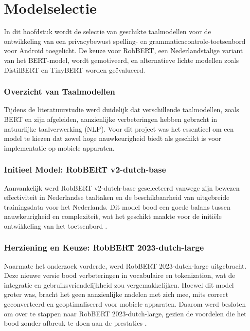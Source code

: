 \chapter{Modelselectie}
\label{ch:modelselectie}

In dit hoofdstuk wordt de selectie van geschikte taalmodellen voor de ontwikkeling van een privacybewust spelling- en grammaticacontrole-toetsenbord voor Android toegelicht. De keuze voor RobBERT, een Nederlandstalige variant van het BERT-model, wordt gemotiveerd, en alternatieve lichte modellen zoals DistilBERT en TinyBERT worden geëvalueerd.

\subsection{Overzicht van Taalmodellen}

Tijdens de literatuurstudie werd duidelijk dat verschillende taalmodellen, zoals BERT en zijn afgeleiden, aanzienlijke verbeteringen hebben gebracht in natuurlijke taalverwerking (NLP). Voor dit project was het essentieel om een model te kiezen dat zowel hoge nauwkeurigheid biedt als geschikt is voor implementatie op mobiele apparaten.

\subsection{Initieel Model: RobBERT v2-dutch-base}

Aanvankelijk werd RobBERT v2-dutch-base geselecteerd vanwege zijn bewezen effectiviteit in Nederlandse taaltaken en de beschikbaarheid van uitgebreide trainingsdata voor het Nederlands. Dit model bood een goede balans tussen nauwkeurigheid en complexiteit, wat het geschikt maakte voor de initiële ontwikkeling van het toetsenbord \autocite{Delobelle2020}.

\subsection{Herziening en Keuze: RobBERT 2023-dutch-large}

Naarmate het onderzoek vorderde, werd RobBERT 2023-dutch-large uitgebracht. Deze nieuwe versie bood verbeteringen in vocabulaire en tokenization, wat de integratie en gebruiksvriendelijkheid zou vergemakkelijken. Hoewel dit model groter was, bracht het geen aanzienlijke nadelen met zich mee, mits correct geconverteerd en geoptimaliseerd voor mobiele apparaten. Daarom werd besloten om over te stappen naar RobBERT 2023-dutch-large, gezien de voordelen die het bood zonder afbreuk te doen aan de prestaties \autocite{Delobelle2023}.

